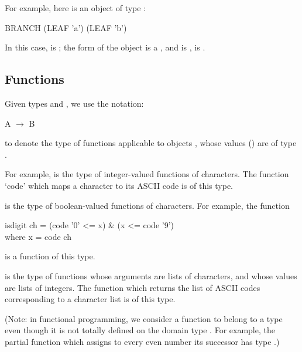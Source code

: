 For example, here is an object of type :
\begin{mlcoded}
    BRANCH (LEAF 'a') (LEAF 'b')
\end{mlcoded}
In this case,  is ; the form of the object is a , and  is
,  is .

\subsection{Functions}
Given types  and , we use the notation:
\begin{mlcoded}
    A $\rightarrow$ B
\end{mlcoded}
to denote the type of functions  applicable to objects , whose values ()
are of type .

For example,  is the type of integer-valued functions of
characters. The function `code' which maps a character to its ASCII code is of
this type.

 is the type of boolean-valued functions of characters. For example, the function
\begin{mlcoded}
    isdigit ch = (code '0' <= x) \& (x <= code '9') \\
    \phantom{isdigit ch =} where x = code ch
\end{mlcoded}
is a function of this type.

\ml{([char] $\rightarrow$ [num])} is the type of functions whose arguments are lists of characters, and whose values are lists of integers. The function which returns the list of ASCII codes corresponding to a character list is of this type.


(Note: in functional programming, we consider a function to belong to a
type  even though it is not totally defined on the domain type . For
example, the partial function which assigns to every even number its successor
has type .)

